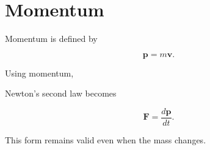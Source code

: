 \section{Momentum}

Momentum is defined by

\[
\boxed{
	\mathbf p
	=
	m\mathbf v.
}
\]

Using momentum,

Newton's second law becomes

\[
\boxed{
	\mathbf F
	=
	\frac{d\mathbf p}{dt}.
}
\]

This form remains valid even when the mass changes.

